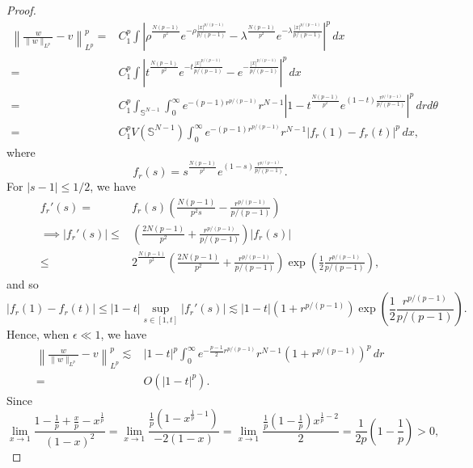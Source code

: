 \documentclass[10pt,a4paper]{amsart}
\begin{document}
\begin{proof}
\begin{align*}
        \left\|\frac{w}{\|w\|_{L^p}}-v\right\|_{L^p}^p ={}& C_1^p \int \left|\rho^{\frac{N(p-1)}{p^2}}e^{-\rho\frac{|x|^{p/(p-1)}}{p/(p-1)}}-\lambda^{\frac{N(p-1)}{p^2}}e^{-\lambda\frac{|x|^{p/(p-1)}}{p/(p-1)}}\right|^p\,dx \\
        ={}& C_1^p \int \left|t^{\frac{N(p-1)}{p^2}}e^{-t\frac{|x|^{p/(p-1)}}{p/(p-1)}}-e^{-\frac{|x|^{p/(p-1)}}{p/(p-1)}}\right|^p\,dx\\
        ={}& C_1^p \int_{\mathbb{S}^{N-1}}\int_0^\infty e^{-(p-1)r^{p/(p-1)}}r^{N-1} \left|1-t^{\frac{N(p-1)}{p^2}}e^{(1-t)\frac{r^{p/(p-1)}}{p/(p-1)}}\right|^p\,drd\theta\\
        ={}& C_1^p V(\mathbb{S}^{N-1}) \int_0^\infty e^{-(p-1)r^{p/(p-1)}}r^{N-1}|f_r(1)-f_r(t)|^p\,dx,
    \end{align*}
    where
    \begin{equation}
        f_r(s) = s^{\frac{N(p-1)}{p^2}}e^{(1-s)\frac{r^{p/(p-1)}}{p/(p-1)}}.
    \end{equation}
    For $|s-1|\le 1/2$, we have
    \begin{align*}
        f_r'(s) ={}& f_r(s) \left(\frac{N(p-1)}{p^2s} - \frac{r^{p/(p-1)}}{p/(p-1)}\right)\\
        \implies |f_r'(s)| \le{}& \left(\frac{2N(p-1)}{p^2} + \frac{r^{p/(p-1)}}{p/(p-1)}\right)|f_r(s)|\\
        \le{}& 2^{\frac{N(p-1)}{p^2}} \left(\frac{2N(p-1)}{p^2} + \frac{r^{p/(p-1)}}{p/(p-1)}\right)\exp\left(\frac 12 \frac{r^{p/(p-1)}}{p/(p-1)}\right),
    \end{align*}
    and so
    \begin{equation}
        |f_r(1)-f_r(t)|\le |1-t|\sup_{s\in[1,t]}|f_r'(s)| \lesssim |1-t|(1+r^{p/(p-1)})\exp\left(\frac 12 \frac{r^{p/(p-1)}}{p/(p-1)}\right).
    \end{equation}
    Hence, when $\epsilon \ll 1$, we have
    \begin{equation}\label{est 7.10}
        \begin{split}
            \left\|\frac{w}{\|w\|_{L^p}}-v\right\|_{L^p}^p \lesssim{}& |1-t|^p \int_0^\infty e^{-\frac{p-1}{2}r^{p/(p-1)}} r^{N-1} (1+r^{p/(p-1)})^p\,dr\\
            ={}& O(|1-t|^p).
        \end{split}
    \end{equation}
    Since
    \begin{equation*}
        \lim_{x\to 1}\frac{1-\frac 1p + \frac xp - x^{\frac 1p}}{(1-x)^2} = \lim_{x\to 1} \frac{\frac 1p\left(1 - x^{\frac 1p -1}\right)}{-2(1-x)} = \lim_{x\to 1}\frac{\frac 1p \left(1-\frac 1p\right) x^{\frac 1p-2}}{2} = \frac{1}{2p}\left(1-\frac 1p\right) >0,

\end{equation*}
\end{proof}
\end{document}
